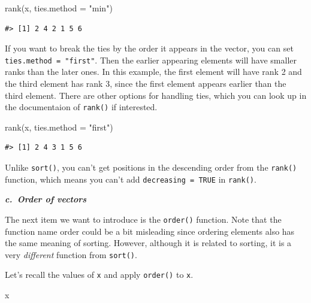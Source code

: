 \documentclass[
]{book}
\newenvironment{Shaded}{\begin{snugshade}}{\end{snugshade}}
\newcommand{\AttributeTok}[1]{\textcolor[rgb]{0.77,0.63,0.00}{#1}}
\newcommand{\FunctionTok}[1]{\textcolor[rgb]{0.00,0.00,0.00}{#1}}
\newcommand{\NormalTok}[1]{#1}
\newcommand{\StringTok}[1]{\textcolor[rgb]{0.31,0.60,0.02}{#1}}
\newenvironment{infobox}[1]
  {
  \begin{itemize}
  \renewcommand{\labelitemi}{
    \raisebox{-.7\height}[0pt][0pt]{
      {\setkeys{Gin}{width=3em,keepaspectratio}
        \texttt{[image: pics/\#1]}}
    }
  }
  \setlength{\fboxsep}{1em}
  \begin{blackbox}
  \item
  }
  {
  \end{blackbox}
  \end{itemize}
  }
\newenvironment{blackbox}{
  \definecolor{shadecolor}{rgb}{0, 0, 0}  %
  \color{white}
  \begin{shaded}}
 {\end{shaded}}
\begin{document}
\begin{Shaded}
\begin{Highlighting}[]
\FunctionTok{rank}\NormalTok{(x, }\AttributeTok{ties.method =} \StringTok{"min"}\NormalTok{)}
\end{Highlighting}
\end{Shaded}

\begin{verbatim}
#> [1] 2 4 2 1 5 6
\end{verbatim}

If you want to break the ties by the order it appears in the vector, you can set \texttt{ties.method\ =\ "first"}. Then the earlier appearing elements will have smaller ranks than the later ones. In this example, the first element will have rank 2 and the third element has rank 3, since the first element appears earlier than the third element. There are other options for handling ties, which you can look up in the documentaion of \texttt{rank()} if interested.

\begin{Shaded}
\begin{Highlighting}[]
\FunctionTok{rank}\NormalTok{(x, }\AttributeTok{ties.method =} \StringTok{"first"}\NormalTok{)}
\end{Highlighting}
\end{Shaded}

\begin{verbatim}
#> [1] 2 4 3 1 5 6
\end{verbatim}

\begin{infobox}{caution}
Unlike \texttt{sort()}, you can't get positions in the descending order from the \texttt{rank()} function, which means you can't add \texttt{decreasing\ =\ TRUE} in \texttt{rank()}.

\end{infobox}

\textbf{\emph{c.~Order of vectors}}

The next item we want to introduce is the \texttt{order()} function. Note that the function name order could be a bit misleading since ordering elements also has the same meaning of sorting. However, although it is related to sorting, it is a very \emph{different} function from \texttt{sort()}.

Let's recall the values of \texttt{x} and apply \texttt{order()} to \texttt{x}.

\begin{Shaded}
\begin{Highlighting}[]
\NormalTok{x}
\end{Highlighting}
\end{Shaded}
\end{document}
